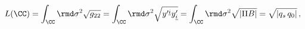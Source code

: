\begin{equation} \label{length}
L(\CC)=\int_{\CC} {\rmd \sigma^2} \sqrt{  g_{22}}
 = \int_{\CC} {\rmd \sigma^2} \sqrt{y'^{\underline{i}}y'_{\underline{i}}}
 = \int_{\CC} {\rmd \sigma^2} \sqrt{|\Pi B|}
 =\sqrt{|q_s\,q_0|}\,,
\label{integratedbps}
\end{equation}

